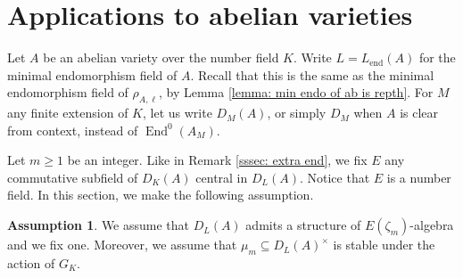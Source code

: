 \documentclass[a4paper,10pt]{amsart}
\theoremstyle{plain}
\theoremstyle{definition}
\newtheorem{assumption}[theorem]{Assumption}
\theoremstyle{remark}
\def\mr#1{\mathrm{#1}}
\newcommand{\bD}{D_L}
\DeclareMathOperator{\End}{End}
\begin{document}
\section{Applications to abelian varieties}

Let \(A\) be an abelian variety over the number field \(K\). Write \( L=L_\mr{end}(A)\) for the minimal endomorphism field of \(A\). Recall that this is the same as the minimal endomorphism field of \(\rho_{A, \ell}\), by Lemma \ref{lemma: min endo of ab is repth}. For \(M\) any finite extension of \(K\), let us write \(D_M(A)\), or simply \(D_M\) when \(A\) is clear from context, instead of \(\End^0(A_M)\).

Let \(m \ge 1\) be an integer. Like in Remark \ref{sssec: extra end}, we fix \(E\) any commutative subfield of \(D_K(A)\) central in \(\bD(A)\). Notice that \(E\) is a number field. In this section, we make the following assumption.

\begin{assumption}\label{ass: mum in end for ab vars}
We assume that \(\bD(A)\) admits a structure of \(E(\zeta_m)\)-algebra and we fix one. Moreover, we assume that \(\mu_m \subseteq \bD(A)^\times\) is stable under the action of \(G_K\).
\end{assumption}
\end{document}
